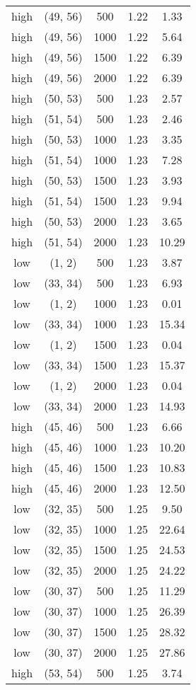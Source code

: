 \begin{tabular}{c c c c c}
high & (49, 56) &  500 & 1.22 & 1.33 \\
high & (49, 56) &  1000 & 1.22 & 5.64 \\
high & (49, 56) &  1500 & 1.22 & 6.39 \\
high & (49, 56) &  2000 & 1.22 & 6.39 \\
high & (50, 53) &  500 & 1.23 & 2.57 \\
high & (51, 54) &  500 & 1.23 & 2.46 \\
high & (50, 53) &  1000 & 1.23 & 3.35 \\
high & (51, 54) &  1000 & 1.23 & 7.28 \\
high & (50, 53) &  1500 & 1.23 & 3.93 \\
high & (51, 54) &  1500 & 1.23 & 9.94 \\
high & (50, 53) &  2000 & 1.23 & 3.65 \\
high & (51, 54) &  2000 & 1.23 & 10.29 \\
low & (1, 2) &  500 & 1.23 & 3.87 \\
low & (33, 34) &  500 & 1.23 & 6.93 \\
low & (1, 2) &  1000 & 1.23 & 0.01 \\
low & (33, 34) &  1000 & 1.23 & 15.34 \\
low & (1, 2) &  1500 & 1.23 & 0.04 \\
low & (33, 34) &  1500 & 1.23 & 15.37 \\
low & (1, 2) &  2000 & 1.23 & 0.04 \\
low & (33, 34) &  2000 & 1.23 & 14.93 \\
high & (45, 46) &  500 & 1.23 & 6.66 \\
high & (45, 46) &  1000 & 1.23 & 10.20 \\
high & (45, 46) &  1500 & 1.23 & 10.83 \\
high & (45, 46) &  2000 & 1.23 & 12.50 \\
low & (32, 35) &  500 & 1.25 & 9.50 \\
low & (32, 35) &  1000 & 1.25 & 22.64 \\
low & (32, 35) &  1500 & 1.25 & 24.53 \\
low & (32, 35) &  2000 & 1.25 & 24.22 \\
low & (30, 37) &  500 & 1.25 & 11.29 \\
low & (30, 37) &  1000 & 1.25 & 26.39 \\
low & (30, 37) &  1500 & 1.25 & 28.32 \\
low & (30, 37) &  2000 & 1.25 & 27.86 \\
high & (53, 54) &  500 & 1.25 & 3.74 \\

\end{tabular}
